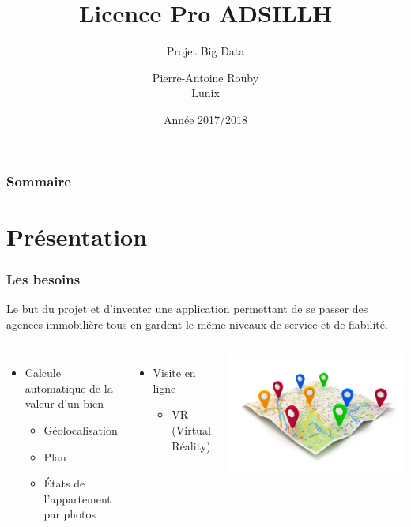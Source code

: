 \documentclass{beamer}
\title{Licence Pro ADSILLH}
\subtitle{Projet Big Data}
\author{Pierre-Antoine Rouby\\Lunix}
\date{Année 2017/2018}
\begin{document}
\frame{\titlepage}

\begin{frame}
  \frametitle{Sommaire}
  \tableofcontents
\end{frame}

\section{Présentation}
\begin{frame}
  \frametitle{Les besoins}

  Le but du projet et d'inventer une application permettant de se passer
  des agences immobilière tous en gardent le même niveaux de service
  et de fiabilité.
  \begin{columns}
    \begin{itemize}
    \item Calcule automatique de la valeur d'un bien
      \begin{itemize}
      \item Géolocalisation
      \item Plan
      \item États de l'appartement par photos
      \end{itemize}
    \end{itemize}
    \begin{itemize}
    \item Visite en ligne
      \begin{itemize}
      \item VR (Virtual Réality)
      \end{itemize}
    \end{itemize}
    \includegraphics[scale=1]{../images/geo.jpg}

\end{columns}
\end{frame}
\end{document}
